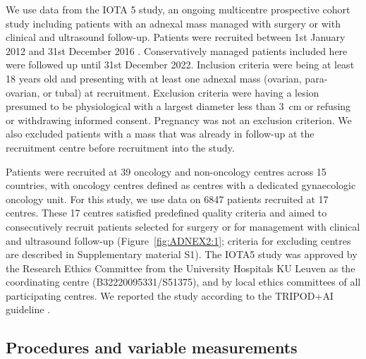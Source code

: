 We use data from the \gls{IOTA} 5 study, an ongoing multicentre prospective cohort study including patients with an adnexal mass managed with surgery or with clinical and ultrasound follow-up. Patients were recruited between 1st January 2012 and 31st December 2016 \cite{timmermanIOTAPhase52025}. Conservatively managed patients included here were followed up until 31st December 2022. Inclusion criteria were being at least 18 years old and presenting with at least one adnexal mass (ovarian, para-ovarian, or tubal) at recruitment. Exclusion criteria were having a lesion presumed to be physiological with a largest diameter less than 3~cm or refusing or withdrawing informed consent. Pregnancy was not an exclusion criterion. We also excluded patients with a mass that was already in follow-up at the recruitment centre before recruitment into the study.

Patients were recruited at 39 oncology and non-oncology centres across 15 countries, with oncology centres defined as centres with a dedicated gynaecologic oncology unit. For this study, we use data on 6847 patients recruited at 17 centres. These 17 centres satisfied predefined quality criteria and aimed to consecutively recruit patients selected for surgery or for management with clinical and ultrasound follow-up (Figure~\ref{fig:ADNEX2:1}; criteria for excluding centres are described in Supplementary material S1). The IOTA5 study was approved by the Research Ethics Committee from the University Hospitals KU Leuven as the coordinating centre (B32220095331/S51375), and by local ethics committees of all participating centres. We reported the study according to the \gls{TRIPOD}+\gls{AI} guideline \cite{collinsTRIPODAIStatementUpdated2024}.

\subsection{Procedures and variable measurements}

